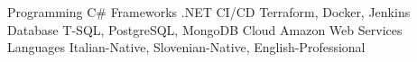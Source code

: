 

\begin{cvskills}

  \cvskill
    {Programming} %
    {C\# } %
  \cvskill
    {Frameworks} %
    {.NET} %
  \cvskill
    {CI/CD} %
    {Terraform, Docker, Jenkins} %
  \cvskill
    {Database} %
    {T-SQL, PostgreSQL, MongoDB} %
  \cvskill
    {Cloud} %
    {Amazon Web Services} %
  \cvskill
    {Languages} %
    {Italian-Native, Slovenian-Native, English-Professional} %

\end{cvskills}
